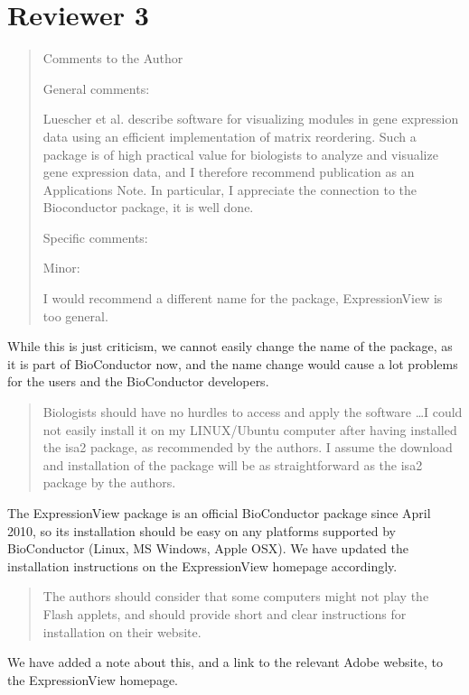 \documentclass[a4paper]{article}
\newenvironment{myquote}{\begin{quote}\color{blue}}{\end{quote}}
\begin{document}
\section*{Reviewer 3}

\begin{myquote}
Comments to the Author

General comments:

Luescher et al. describe software for visualizing modules in gene
expression data using an efficient implementation of matrix
reordering. Such a package is of high practical value for biologists
to analyze and visualize gene expression data, and I therefore
recommend publication as an Applications Note. In particular, I
appreciate the connection to the Bioconductor package, it is well
done.

Specific comments:

Minor:

I would recommend a different name for the package, ExpressionView is
too general.
\end{myquote}

While this is just criticism, we cannot easily change the name of the
package, as it is part of BioConductor now, and the name change would
cause a lot problems for the users and the BioConductor developers.

\begin{myquote}
Biologists should have no hurdles to access and apply the software
\ldots I could not easily install it on my LINUX/Ubuntu computer after
having installed the isa2 package, as recommended by the authors. 
I assume the download and installation of the package will be as
straightforward as the isa2 package by the authors.
\end{myquote}

The ExpressionView package is an official BioConductor package since
April 2010, so its installation should be easy on any platforms
supported by BioConductor (Linux, MS Windows, Apple OSX). We have
updated the installation instructions on the ExpressionView homepage
accordingly.

\begin{myquote}
The authors should consider that some computers might not play the
Flash applets, and should provide short and clear instructions for
installation on their website.
\end{myquote}

We have added a note about this, and a link to the relevant Adobe
website, to the ExpressionView homepage.



\end{document}

